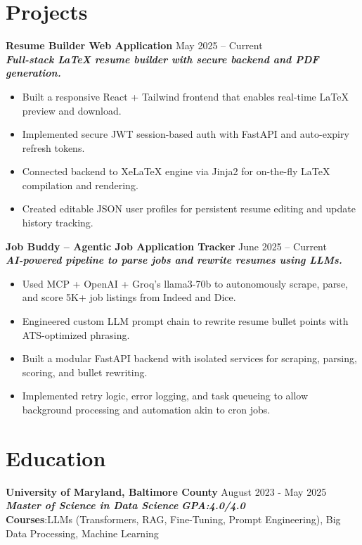 \documentclass[a4paper,11pt]{article}
\begin{document}
\section{Projects}
\textbf{Resume Builder Web Application} \hfill May 2025 – Current\\[1pt]
\textbf{\textit{Full-stack LaTeX resume builder with secure backend and PDF generation.}}\vspace{-5pt}
\begin{itemize}[nosep, after=\strut, leftmargin=1em, itemsep=0.8pt]
    
    \item Built a responsive React + Tailwind frontend that enables real-time LaTeX preview and download.
    \item Implemented secure JWT session-based auth with FastAPI and auto-expiry refresh tokens.
    \item Connected backend to XeLaTeX engine via Jinja2 for on-the-fly LaTeX compilation and rendering.
    \item Created editable JSON user profiles for persistent resume editing and update history tracking.
    \end{itemize}

\textbf{Job Buddy – Agentic Job Application Tracker} \hfill June 2025 – Current\\[1pt]
\textbf{\textit{AI-powered pipeline to parse jobs and rewrite resumes using LLMs.}}\vspace{-5pt}
\begin{itemize}[nosep, after=\strut, leftmargin=1em, itemsep=0.8pt]
    
    \item Used MCP + OpenAI + Groq’s llama3-70b to autonomously scrape, parse, and score 5K+ job listings from Indeed and Dice.
    \item Engineered custom LLM prompt chain to rewrite resume bullet points with ATS-optimized phrasing.
    \item Built a modular FastAPI backend with isolated services for scraping, parsing, scoring, and bullet rewriting.
    \item Implemented retry logic, error logging, and task queueing to allow background processing and automation akin to cron jobs.
    \end{itemize}




\section{Education}
\textbf{University of Maryland, Baltimore County} \hfill August 2023 - May 2025\\
\textbf{\textit{Master of Science in Data Science}} \hfill \textit{\textbf{GPA:4.0/4.0}}\\ 
\textbf{Courses}:LLMs (Transformers, RAG, Fine-Tuning, Prompt Engineering), Big Data Processing, Machine Learning
\end{document}
